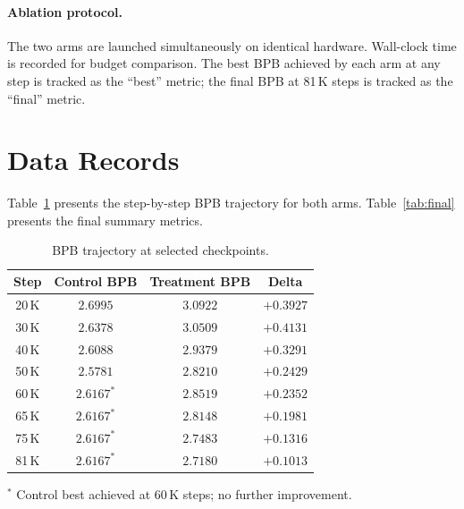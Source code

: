 \documentclass[11pt,a4paper]{article}
\begin{document}
\paragraph{Ablation protocol.}  The two arms are launched
simultaneously on identical hardware.  Wall-clock time is recorded for
budget comparison.  The best BPB achieved by each arm at any step is
tracked as the ``best'' metric; the final BPB at 81\,K steps is tracked
as the ``final'' metric.

\section{Data Records}

Table~\ref{tab:trajectory} presents the step-by-step BPB trajectory for
both arms.  Table~\ref{tab:final} presents the final summary metrics.

\begin{table}[htbp]
\centering
\caption{BPB trajectory at selected checkpoints.}
\label{tab:trajectory}
\begin{tabular}{@{}cccc@{}}
\toprule
Step & Control BPB & Treatment BPB & Delta \\
\midrule
20\,K & $2.6995$ & $3.0922$ & $+0.3927$ \\
30\,K & $2.6378$ & $3.0509$ & $+0.4131$ \\
40\,K & $2.6088$ & $2.9379$ & $+0.3291$ \\
50\,K & $2.5781$ & $2.8210$ & $+0.2429$ \\
60\,K & $\mathbf{2.6167}^{*}$ & $2.8519$ & $+0.2352$ \\
65\,K & $\mathbf{2.6167}^{*}$ & $2.8148$ & $+0.1981$ \\
75\,K & $\mathbf{2.6167}^{*}$ & $2.7483$ & $+0.1316$ \\
81\,K & $\mathbf{2.6167}^{*}$ & $2.7180$ & $+0.1013$ \\
\bottomrule
\end{tabular}
\begin{flushleft}
\small $^{*}$ Control best achieved at 60\,K steps; no further improvement.
\end{flushleft}
\end{table}
\end{document}
